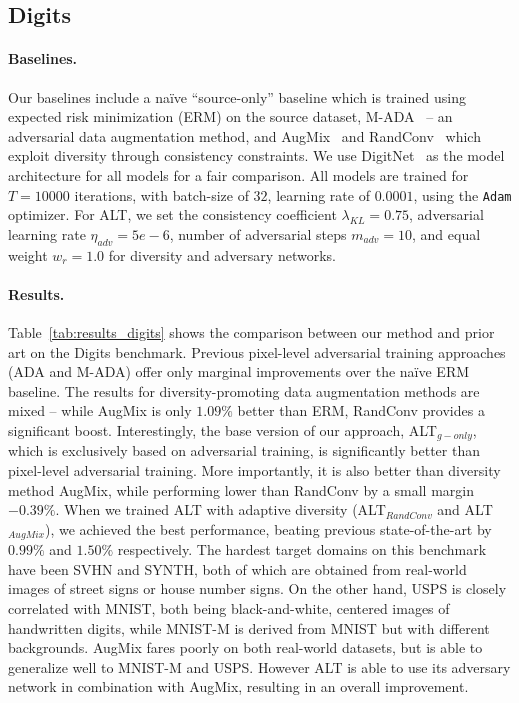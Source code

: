 
\subsection{Digits}
\paragraph{Baselines.}
Our baselines include a na\"ive ``source-only'' baseline which is trained using expected risk minimization (ERM) on the source dataset, M-ADA~\citep{qiao2020learning} -- an adversarial data augmentation method, and AugMix~\citep{hendrycks2019augmix} 
and RandConv~\citep{xu2020robust} which exploit diversity through consistency constraints.
We use DigitNet~\citep{volpi2018generalizing} as the model architecture for all models for a fair comparison.
All models are trained for $T{=}10000$ iterations, with batch-size of $32$, learning rate of $0.0001$, using the \texttt{Adam} optimizer.
For ALT, we set the consistency coefficient $\lambda_{KL}{=}0.75$, adversarial learning rate $\eta_{adv}{=}5e{-}6$, number of adversarial steps $m_{adv}{=}10$, and equal weight $w_r{=}1.0$ for diversity and adversary networks.

\paragraph{Results.}
Table~\ref{tab:results_digits} shows the comparison between our method and prior art on the Digits benchmark.
Previous pixel-level adversarial training approaches (ADA and M-ADA) offer only marginal improvements over the na\"ive ERM baseline. The results for diversity-promoting data augmentation methods are mixed -- while AugMix is only $1.09\%$ better than ERM, RandConv provides a significant boost. Interestingly, the base version of our approach, ALT$_{g-only}$, which is exclusively based on adversarial training, is significantly better than pixel-level adversarial training.
More importantly, it is also better than diversity method AugMix, while performing lower than RandConv by a small margin $-0.39\%$.
When we trained ALT with  adaptive diversity (ALT$_{RandConv}$ and ALT$_{AugMix}$), we achieved the best performance, beating previous state-of-the-art by $0.99\%$ and $1.50\%$ respectively.
The hardest target domains on this benchmark have been SVHN and SYNTH, both of which are obtained from real-world images of street signs or house number signs.
On the other hand, USPS is closely correlated with MNIST, both being black-and-white, centered images of handwritten digits, while MNIST-M is derived from MNIST but with different backgrounds. AugMix fares poorly on both real-world datasets, but is able to generalize well to MNIST-M and USPS. However ALT is able to use its adversary network in combination with AugMix, resulting in an overall improvement.

